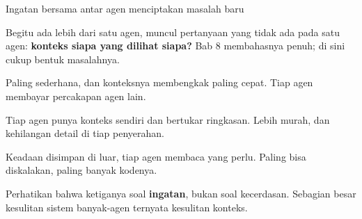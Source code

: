 \documentclass[aspectratio=169,11pt,t]{beamer}
\begin{document}
\begin{frame}[shrink=25]{Ingatan bersama antar agen menciptakan masalah baru}
{\fontsize{9.4}{12.6}\selectfont\color{fg2}Begitu ada lebih dari satu agen, muncul pertanyaan yang tidak ada pada satu agen: \textbf{konteks siapa yang dilihat siapa?} Bab 8 membahasnya penuh; di sini cukup bentuk masalahnya.\par}\vskip 4pt
\begin{minipage}[t]{0.3253\textwidth}
\begin{icard}
Paling sederhana, dan konteksnya membengkak paling cepat. Tiap agen membayar percakapan agen lain.
\end{icard}
\end{minipage}%
\hfill
\begin{minipage}[t]{0.3253\textwidth}
\begin{icardaccent}
Tiap agen punya konteks sendiri dan bertukar ringkasan. Lebih murah, dan kehilangan detail di tiap penyerahan.
\end{icardaccent}
\end{minipage}%
\hfill
\begin{minipage}[t]{0.3253\textwidth}
\begin{icard}
Keadaan disimpan di luar, tiap agen membaca yang perlu. Paling bisa diskalakan, paling banyak kodenya.
\end{icard}
\end{minipage}%
\begin{iband}[signal]
Perhatikan bahwa ketiganya soal \textbf{ingatan}, bukan soal kecerdasan. Sebagian besar kesulitan sistem banyak-agen ternyata kesulitan konteks.
\end{iband}
\end{frame}
\end{document}
